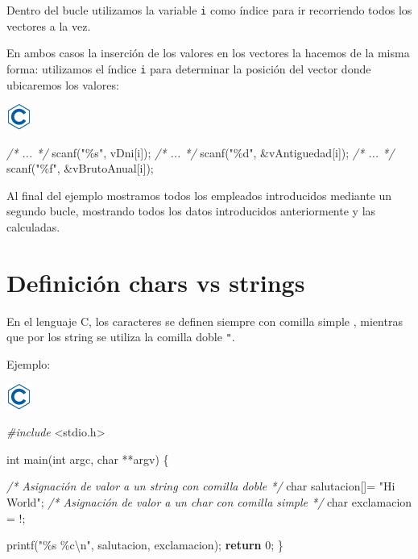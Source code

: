 \documentclass[
]{book}
\newenvironment{Shaded}{\begin{snugshade}}{\end{snugshade}}
\newcommand{\CharTok}[1]{\textcolor[rgb]{0.31,0.60,0.02}{#1}}
\newcommand{\CommentTok}[1]{\textcolor[rgb]{0.56,0.35,0.01}{\textit{#1}}}
\newcommand{\ControlFlowTok}[1]{\textcolor[rgb]{0.13,0.29,0.53}{\textbf{#1}}}
\newcommand{\DataTypeTok}[1]{\textcolor[rgb]{0.13,0.29,0.53}{#1}}
\newcommand{\DecValTok}[1]{\textcolor[rgb]{0.00,0.00,0.81}{#1}}
\newcommand{\ImportTok}[1]{#1}
\newcommand{\NormalTok}[1]{#1}
\newcommand{\PreprocessorTok}[1]{\textcolor[rgb]{0.56,0.35,0.01}{\textit{#1}}}
\newcommand{\SpecialCharTok}[1]{\textcolor[rgb]{0.00,0.00,0.00}{#1}}
\newcommand{\StringTok}[1]{\textcolor[rgb]{0.31,0.60,0.02}{#1}}
\begin{document}
Dentro del bucle utilizamos la variable \texttt{i} como índice para ir recorriendo todos los vectores a la vez.

En ambos casos la inserción de los valores en los vectores la hacemos de la misma forma: utilizamos el índice \texttt{i} para determinar la posición del vector donde ubicaremos los valores:

\includegraphics{./img/c.png}

\begin{Shaded}
\begin{Highlighting}[]
\CommentTok{/* ... */}
\NormalTok{scanf(}\StringTok{"\%s"}\NormalTok{, vDni[i]);}
\CommentTok{/* ... */}
\NormalTok{scanf(}\StringTok{"\%d"}\NormalTok{, \&vAntiguedad[i]);}
\CommentTok{/* ... */}
\NormalTok{scanf(}\StringTok{"\%f"}\NormalTok{, \&vBrutoAnual[i]);}
\end{Highlighting}
\end{Shaded}

Al final del ejemplo mostramos todos los empleados introducidos mediante un segundo bucle, mostrando todos los datos introducidos anteriormente y las calculadas.

\hypertarget{definiciuxf3n-chars-vs-strings}{%
\section{Definición chars vs strings}\label{definiciuxf3n-chars-vs-strings}}

En el lenguaje C, los caracteres se definen siempre con comilla simple \texttt{\textquotesingle{}}, mientras que por los string se utiliza la comilla doble \texttt{"}.

Ejemplo:

\includegraphics{./img/c.png}

\begin{Shaded}
\begin{Highlighting}[]
\PreprocessorTok{\#include }\ImportTok{\textless{}stdio.h\textgreater{}}

\DataTypeTok{int}\NormalTok{ main(}\DataTypeTok{int}\NormalTok{ argc, }\DataTypeTok{char}\NormalTok{ **argv) \{}
    
    \CommentTok{/* Asignación de valor a un string con comilla doble */}
    \DataTypeTok{char}\NormalTok{ salutacion[]= }\StringTok{"Hi World"}\NormalTok{;}
    \CommentTok{/* Asignación de valor a un char con comilla simple */}
    \DataTypeTok{char}\NormalTok{ exclamacion = }\CharTok{\textquotesingle{}!\textquotesingle{}}\NormalTok{;}
    
\NormalTok{    printf(}\StringTok{"\%s \%c}\SpecialCharTok{\textbackslash{}n}\StringTok{"}\NormalTok{, salutacion, exclamacion);}
    \ControlFlowTok{return} \DecValTok{0}\NormalTok{;}
\NormalTok{\}}
\end{Highlighting}
\end{Shaded}
\end{document}
